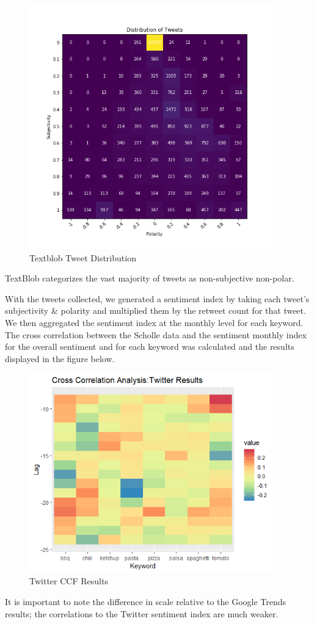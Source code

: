 \documentclass[12pt,oneside]{chicagocapstone}
\begin{document}
\begin{figure}

{\centering \includegraphics[width=400px]{figure/Tweet_Distribution} 

}

\caption{Textblob Tweet Distribution}\label{fig:tweet-distribution}
\end{figure}
TextBlob categorizes the vast majority of tweets as non-subjective
non-polar.

With the tweets collected, we generated a sentiment index by taking each
tweet's subjectivity \& polarity and multiplied them by the retweet
count for that tweet. We then aggregated the sentiment index at the
monthly level for each keyword. The cross correlation between the
Scholle data and the sentiment monthly index for the overall sentiment
and for each keyword was calculated and the results displayed in the
figure below.
\begin{figure}

{\centering \includegraphics[width=400px]{figure/CCF_Twitter_Results} 

}

\caption{Twitter CCF Results}\label{fig:tweet-ccf}
\end{figure}
It is important to note the difference in scale relative to the Google
Trends results; the correlations to the Twitter sentiment index are much
weaker.
\end{document}
